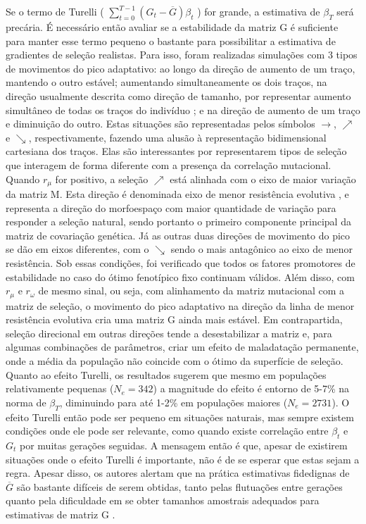Se o termo de Turelli (  $\sum_{t=0}^{T-1} (G_t - \overline {G})
\beta_t$ ) for grande, a estimativa de $\beta_T$ será precária. 
É necessário então avaliar se a estabilidade da matriz G é suficiente
para manter esse termo pequeno o bastante para possibilitar a
estimativa de gradientes de seleção realistas. 
Para isso, foram realizadas simulações com 3 tipos de movimentos do pico
adaptativo: ao longo da direção de aumento de um traço, mantendo o outro
estável; aumentando simultaneamente os dois traços, na direção usualmente
descrita como direção de tamanho, por representar aumento simultâneo de
todas os traços do indivíduo \citep{Marroig2005}; e na direção de
aumento de um traço e diminuição do outro. 
Estas situações são representadas pelos símbolos $\rightarrow$,
$\nearrow$ e $\searrow$, respectivamente, fazendo uma alusão à
representação bidimensional cartesiana dos traços. 
Elas são interessantes por representarem tipos de seleção que interagem
de forma diferente com a presença da correlação mutacional. 
Quando $r_\mu$ for positivo, a seleção $\nearrow$ está alinhada com o
eixo de maior variação da matriz M. 
Esta direção é denominada eixo de menor resistência evolutiva
\citep{Schluter1996}, e  representa a direção do morfoespaço com maior
quantidade de variação para responder a seleção natural, sendo portanto
o primeiro componente principal da matriz de covariação genética. 
Já as outras duas direções de movimento do pico se dão em eixos
diferentes, com o $\searrow$ sendo o mais antagônico ao eixo de menor
resistência. 
Sob essas condições, foi verificado que todos os fatores promotores de
estabilidade no caso do ótimo fenotípico fixo continuam válidos. 
Além disso, com $r_\mu$ e $r_\omega$ de mesmo sinal, ou seja, com
alinhamento da matriz mutacional com a matriz de seleção, o movimento
do pico adaptativo na direção da linha de menor resistência evolutiva
cria uma matriz G ainda mais estável. 
Em contrapartida, seleção direcional em outras direções tende a
desestabilizar a matriz e, para algumas combinações de parâmetros, criar
um efeito de maladatação permanente, onde a média da população não
coincide com o ótimo da superfície de seleção. 
Quanto ao efeito Turelli, os resultados sugerem que mesmo em populações
relativamente pequenas ($N_e=342$) a magnitude do efeito é entorno de
5-7\% na norma de $\beta_T$, diminuindo para até 1-2\% em populações
maiores ($N_e=2731$). 
O efeito Turelli então pode ser pequeno em situações naturais, mas
sempre existem condições onde ele pode ser relevante, como quando existe
correlação entre $\beta_t$ e $G_t$ por muitas gerações seguidas. 
A mensagem então é que, apesar de existirem situações onde o efeito
Turelli é importante, não é de se esperar que estas sejam a regra. 
Apesar disso, os autores alertam que na prática estimativas fidedignas
de $\overline {G}$ são bastante difíceis de serem obtidas, tanto pelas
flutuações entre gerações quanto pela dificuldade em se obter tamanhos
amostrais adequados para estimativas de matriz G \citep{Marroig2011b}.

